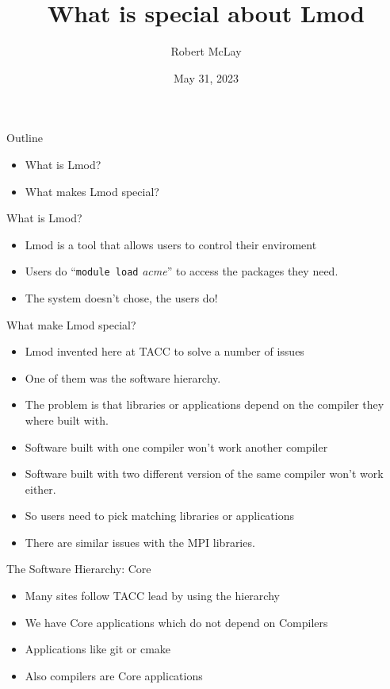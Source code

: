 \documentclass{beamer}
\begin{document}
\title[Lmod]{What is special about Lmod}
\author{Robert McLay} 
\date{May 31, 2023}

\frame{\titlepage} 


\begin{frame}{Outline}
  \begin{itemize}
    \item What is Lmod?
    \item What makes Lmod special?
  \end{itemize}
\end{frame}

\begin{frame}{What is Lmod?}
  \begin{itemize}
    \item Lmod is a tool that allows users to control their enviroment
    \item Users do ``\texttt{module load} \emph{acme}'' to access the
      packages they need.
    \item The system doesn't chose, the users do!
  \end{itemize}
\end{frame}

\begin{frame}{What make Lmod special?}
  \begin{itemize}
    \item Lmod invented here at TACC to solve a number of issues
    \item One of them was the software hierarchy.
    \item The problem is that libraries or applications depend on the
      compiler they where built with.
    \item Software built with one compiler won't work another compiler
    \item Software built with two different version of the same
      compiler won't work either.
    \item So users need to pick matching libraries or applications
    \item There are similar issues with the MPI libraries.
  \end{itemize}
\end{frame}

\begin{frame}{The Software Hierarchy: Core}
    \begin{itemize}
      \item Many sites follow TACC lead by using the hierarchy
      \item We have Core applications which do not depend on Compilers
      \item Applications like git or cmake
      \item Also compilers are Core applications
    \end{itemize}
\end{frame}
\end{document}
